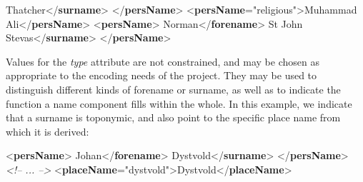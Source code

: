 \begin{shaded}
Thatcher{</\textbf{surname}>}\mbox{}\newline 
{</\textbf{persName}>}\mbox{}\newline 
{<\textbf{persName}\hspace*{1em}{type}="{religious}">}Muhammad Ali{</\textbf{persName}>}\mbox{}\newline 
{<\textbf{persName}>}\mbox{}\newline 
{}Norman{</\textbf{forename}>}\mbox{}\newline 
{}St John Stevas{</\textbf{surname}>}\mbox{}\newline 
{</\textbf{persName}>}\end{shaded}\egroup\par \noindent  Values for the {\itshape type} attribute are not constrained, and may be chosen as appropriate to the encoding needs of the project. They may be used to distinguish different kinds of forename or surname, as well as to indicate the function a name component fills within the whole. In this example, we indicate that a surname is toponymic, and also point to the specific place name from which it is derived: \par\bgroup{}\exampleFont \begin{shaded}\noindent\mbox{}{<\textbf{persName}>}\mbox{}\newline 
{}Johan{</\textbf{forename}>}\mbox{}\newline 
{}Dystvold{</\textbf{surname}>}\mbox{}\newline 
{</\textbf{persName}>}\mbox{}\newline 
\textit{<!-- ... -->}\mbox{}\newline 
{<\textbf{placeName}\hspace*{1em}{xml:id}="{dystvold}">}Dystvold{</\textbf{placeName}>}\end{shaded}\egroup\par \par
